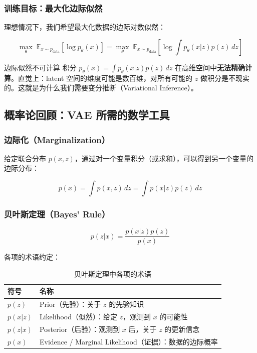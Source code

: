 \subsubsection{训练目标：最大化边际似然}

理想情况下，我们希望最大化数据的边际对数似然：

$$\max_\theta \; \mathbb{E}_{x \sim p_{\text{data}}} [\log p_\theta(x)] = \max_\theta \; \mathbb{E}_{x \sim p_{\text{data}}} \left[\log \int p_\theta(x|z) p(z) \, dz \right]$$

\begin{warningbox}{边际似然不可计算}
积分 $p_\theta(x) = \int p_\theta(x|z) p(z) \, dz$ 在高维空间中\textbf{无法精确计算}。直觉上：latent 空间的维度可能是数百维，对所有可能的 $z$ 做积分是不现实的。这就是为什么我们需要变分推断（Variational Inference）。
\end{warningbox}

\subsection{概率论回顾：VAE 所需的数学工具}

\subsubsection{边际化（Marginalization）}

给定联合分布 $p(x, z)$，通过对一个变量积分（或求和），可以得到另一个变量的边际分布：

$$p(x) = \int p(x, z) \, dz = \int p(x|z) p(z) \, dz$$

\subsubsection{贝叶斯定理（Bayes' Rule）}

$$p(z|x) = \frac{p(x|z) p(z)}{p(x)}$$

各项的术语约定：

\begin{table}[H]
\centering
\begin{tabular}{ll}
\toprule
符号 & 名称 \\
\midrule
$p(z)$ & Prior（先验）：关于 $z$ 的先验知识 \\
$p(x|z)$ & Likelihood（似然）：给定 $z$，观测到 $x$ 的可能性 \\
$p(z|x)$ & Posterior（后验）：观测到 $x$ 后，关于 $z$ 的更新信念 \\
$p(x)$ & Evidence / Marginal Likelihood（证据）：数据的边际概率 \\
\bottomrule
\end{tabular}
\caption{贝叶斯定理中各项的术语}
\end{table}

